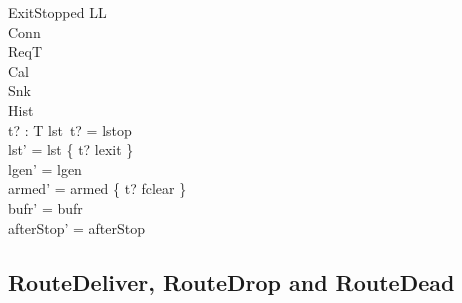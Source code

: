 \documentclass[a4paper,10pt,fleqn]{article}
\begin{document}
\begin{schema}{ExitStopped}
  \Delta LL \\
  \Xi Conn \\
  \Xi ReqT \\
  \Xi Cal \\
  \Xi Snk \\
  \Xi Hist \\
  t? : T
\where
  lst~t? = lstop \\
  lst' = lst \oplus \{ t? \mapsto lexit \} \\
  lgen' = lgen \\
  armed' = armed \oplus \{ t? \mapsto fclear \} \\
  bufr' = bufr \\
  afterStop' = afterStop
\end{schema}

\subsection{RouteDeliver, RouteDrop and RouteDead}
\end{document}
